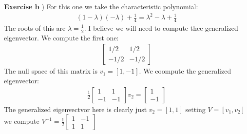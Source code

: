 \documentclass[12pt]{article}
\newenvironment{exercise}[1]{\vspace{.1in}\noindent\textbf{Exercise #1 \hspace{.05em}}}{}
\theoremstyle{definition}
\theoremstyle{remark}
\begin{document}
\begin{exercise}{4.1}
	b) For this one we take the characteristic polynomial:
	\begin{align}
		(1-\lambda)(-\lambda)+\frac{1}{4}=\lambda^2-\lambda+\frac{1}{4}
	\end{align}
	The roots of this are $\lambda =\frac{1}{2}$. I believe we will need to compute thee generalized eigenvector. We compute the first one:
	\begin{align}
		\begin{bmatrix}
			1/2  & 1/2  \\
			-1/2 & -1/2
		\end{bmatrix}
	\end{align}
	The null space of this matrix is $v_1=[1,-1]$. We coompute the generalized eigenvector:
	\begin{align}
		\frac{1}{2}%
		\begin{bmatrix}
			1  & 1  \\
			-1 & -1
		\end{bmatrix}v_2=%
		\begin{bmatrix}
			1 \\
			-1
		\end{bmatrix}
	\end{align}
	The generalized eigenvectvor here is clearly just $v_2=[1,1]$ setting $V=[v_1,v_2]$ we compute $V^{-1}=\frac{1}{2}%
		\begin{bmatrix}
			1 & -1 \\
			1 & 1
		\end{bmatrix}$


\end{exercise}
\end{document}
